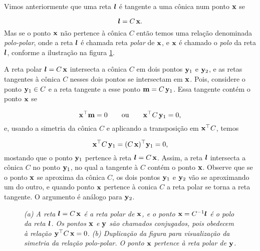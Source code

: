 Vimos anteriormente que uma reta $\boldsymbol{l}$ é tangente a uma cônica num ponto $\mathbf{x}$ se 

\begin{equation*}
\boldsymbol{l}=C\,\mathbf{x}.
\end{equation*}
Mas se o ponto $\mathbf{x}$ não pertence à cônica $C$ então temos uma relação denominada \textit{polo-polar}, onde a reta $\boldsymbol{l}$ é chamada reta \textit{polar} de $\mathbf{x}$, e $\mathbf{x}$ é chamado o \textit{polo} da reta $\boldsymbol{l}$, conforme a ilustração na figura \ref{fig.polo-polar}.

A reta polar $\boldsymbol{l}=C\,\mathbf{x}$ intersecta a cônica 
$C$ em dois pontos ${\bf y}_1$ e ${\bf y}_2$, e as retas tangentes à cônica $C$ nesses dois pontos se intersectam em $\mathbf{x}$. Pois, considere o ponto ${\bf y}_1 \in C$ e a reta tangente a esse ponto ${\bf m}=C\,{\bf y}_1$. Essa tangente contém o ponto $\mathbf{x}$ se 

\begin{equation*}
\mathbf{x}^\top{\bf m}=0\qquad\text{ou}\qquad\mathbf{x}^\top C\,{\bf y}_1=0,
\end{equation*}  
e, usando a simetria da cônica $C$ e aplicando a transposição em $\mathbf{x}^\top C$, temos

\begin{equation*}
\mathbf{x}^\top C\,{\bf y}_1=(C\,\mathbf{x})^\top{\bf y}_1=0,
\end{equation*}
mostando que o ponto ${\bf y}_1$ pertence à reta $\boldsymbol{l}=C\,\mathbf{x}$. Assim, a reta $\boldsymbol{l}$ intersecta a cônica $C$ no ponto ${\bf y}_1$, no qual a tangente à $C$ contém o ponto $\mathbf{x}$. Observe que se o ponto $\mathbf{x}$ se aproxima da cônica $C$, os dois pontos ${\bf y}_1$ e ${\bf y}_2$ vão se aproximando um do outro, e quando ponto $\mathbf{x}$ pertence à conica $C$ a reta polar se torna a reta tangente. O argumento é análogo para ${\bf y}_2$.\\


\begin{figure}[!htb]
\centering
{}
\quad
{}
\caption{\textit{(a) A reta $\boldsymbol{l}=C\,\mathbf{x}$ é a reta polar de $\mathbf{x}$, e o ponto $\mathbf{x}=C^{-1}\boldsymbol{l}$ é o polo da reta $\boldsymbol{l}$. Os pontos $\mathbf{x}$ e ${\bf y}$ são chamados conjugados, pois obedecem à relação ${\bf y}^\top C\,\mathbf{x}=0$. (b) Duplicação da figura para visualização da simetria da relação polo-polar. O ponto $\mathbf{x}$ pertence à reta polar de ${\bf y}$.}}
\label{fig.polo-polar}
\end{figure}







